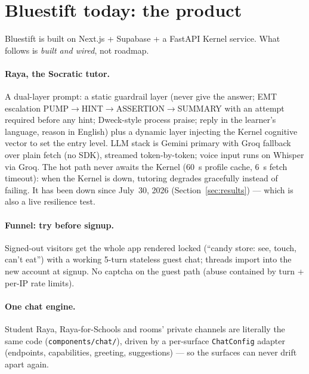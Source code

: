 \documentclass[11pt,a4paper]{article}
\let\oldsection\section
\renewcommand{\section}{\clearpage\oldsection}
\begin{document}
\section{Bluestift today: the product}
\label{sec:product}

Bluestift is built on Next.js + Supabase + a FastAPI Kernel service.
What follows is \emph{built and wired}, not roadmap.

\paragraph{Raya, the Socratic tutor.} A dual-layer prompt: a static guardrail
layer (never give the answer; EMT escalation PUMP$\to$HINT$\to$ASSERTION$\to$SUMMARY
with an attempt required before any hint; Dweck-style process praise; reply in
the learner's language, reason in English) plus a dynamic layer injecting the
Kernel cognitive vector to set the entry level. LLM stack is Gemini primary
with Groq fallback over plain fetch (no SDK), streamed token-by-token;
voice input runs on Whisper via Groq. The hot path never awaits the Kernel
(60~s profile cache, 6~s fetch timeout): when the Kernel is down, tutoring
degrades gracefully instead of failing. It has been down since July~30, 2026
(Section~\ref{sec:results}) --- which is also a live resilience test.

\paragraph{Funnel: try before signup.} Signed-out visitors get the whole app
rendered locked (``candy store: see, touch, can't eat'') with a working
5-turn stateless guest chat; threads import into the new account at signup.
No captcha on the guest path (abuse contained by turn + per-IP rate limits).

\paragraph{One chat engine.} Student Raya, Raya-for-Schools and rooms' private
channels are literally the same code (\texttt{components/chat/}), driven by a
per-surface \texttt{ChatConfig} adapter (endpoints, capabilities, greeting,
suggestions) --- so the surfaces can never drift apart again.
\end{document}
